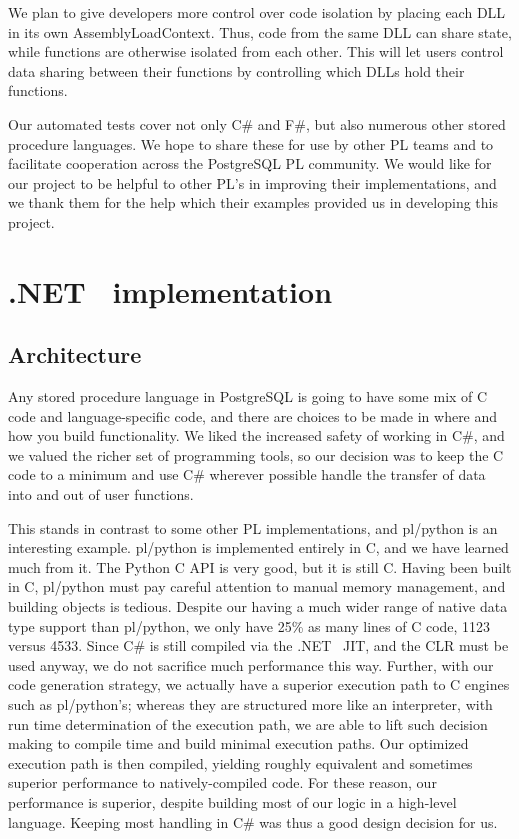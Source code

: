\documentclass[sigconf,techreport,authorversion,nonacm]{acmart}
\newcommand{\dotnet}{.NET }
\begin{document}
We plan to give developers more control over code isolation by
placing each DLL in its own AssemblyLoadContext.  Thus, code from
the same DLL can share state, while functions are otherwise isolated
from each other.  This will let users control data sharing between
their functions by controlling which DLLs hold their functions.

Our automated tests cover not only C\# and F\#, but also numerous
other stored procedure languages.  We hope to share these for use
by other PL teams and to facilitate cooperation across the PostgreSQL
PL community.  We would like for our project to be helpful to
other PL's in improving their implementations, and we thank them
for the help which their examples provided us in developing this
project.

\section{\dotnet\ implementation}

\subsection{Architecture}

Any stored procedure language in PostgreSQL is going to have some
mix of C code and language-specific code, and there are choices to
be made in where and how you build functionality. We liked the
increased safety of working in C\#, and we valued the richer set of
programming tools, so our decision was to keep the C code to a
minimum and use C\# wherever possible handle the transfer of data
into and out of user functions.

This stands in contrast to some other PL implementations, and pl/python
is an interesting example.  pl/python is implemented entirely in C,
and we have learned much from it.  The Python C API is very good,
but it is still C.  Having been built in C, pl/python must pay careful
attention to manual memory management, and building objects is tedious.
Despite our having a much wider range of native data type support than
pl/python, we only have 25\% as many lines of C code, 1123 versus 4533.
Since C\# is still compiled via the \dotnet\ JIT, and the CLR must be
used anyway, we do not sacrifice much performance this way.  Further,
with our code generation strategy, we actually have a superior execution
path to C engines such as pl/python's; whereas they are structured more
like an interpreter, with run time determination of the execution path,
we are able to lift such decision making to compile time and build
minimal execution paths.  Our optimized execution path is then
compiled, yielding roughly equivalent and sometimes superior performance
to natively-compiled code.  For these reason, our performance is superior,
despite building most of our logic in a high-level language.  Keeping most
handling in C\# was thus a good design decision for us.
\end{document}
